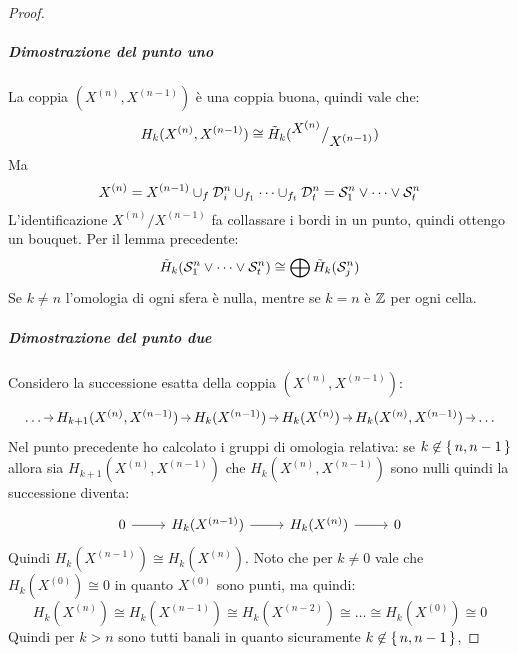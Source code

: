 \begin{proof}
  \subparagraph{Dimostrazione del punto uno}
    La coppia $ (X^{(n)}, X^{(n-1)}) $ è una coppia buona, quindi vale che:
    \[
      H_k(X^{(n)}, X^{(n-1)}) \cong \tilde{H}_k({^{\textstyle X^{(n)}}\big/_{\textstyle X^{(n-1)}}})
    \]
    Ma
    \[
      X^{(n)} = X^{(n-1)} \cup_f \mathcal{D}^{n}_{i} \cup_{f_1} \dots \cup_{f_t} \mathcal{D}^{n}_{t} = \mathcal{S}^{n}_{1} \vee \dots \vee \mathcal{S}^{n}_{t}
    \]
    L'identificazione $ {X^{(n)}} \slash {X^{(n-1)}} $ fa collassare i bordi in un punto, quindi ottengo
    un bouquet.
    Per il lemma precedente:
    \[
      \tilde{H}_k(\mathcal{S}^{n}_{1} \vee \dots \vee \mathcal{S}^{n}_{t}) \cong \bigoplus \tilde{H}_k(\mathcal{S}^{n}_{j})
    \]
    Se $ k \not = n $ l'omologia di ogni sfera è nulla, mentre se $ k = n $ è
    $ \mathbb{Z} $ per ogni cella.

    \subparagraph{Dimostrazione del punto due}
    Considero la successione esatta della coppia $ (X^{(n)}, X^{(n-1)}) $:
    \[
      \begin{tikzcd}[nodes={column sep=7pt, inner sep = 2 pt }]
        \dots \rar & H_{k+1}(X^{(n)}, X^{(n-1)}) \rar & H_k(X^{(n-1)}) \rar & H_k(X^{(n)}) \rar & H_{k}(X^{(n)}, X^{(n-1)}) \rar & \dots
      \end{tikzcd}
    \]
    Nel punto precedente ho calcolato i gruppi di omologia relativa:
    se $ k \not \in \set{n, n-1} $ allora sia
    $ H_{k+1}(X^{(n)}, X^{(n-1)}) $ che $ H_k(X^{(n)}, X^{(n-1)}) $ sono nulli
    quindi la successione diventa:
    \[
      \begin{tikzcd}
        0 \rar   & H_k(X^{(n-1)}) \rar  & H_k(X^{(n)}) \rar & 0
      \end{tikzcd}
    \]
    Quindi $ H_k(X^{(n-1)}) \cong H_k(X^{(n)}) $. Noto che per $ k \not = 0 $ vale che
    $ H_k(X^{(0)}) \cong 0 $ in quanto $ X^{(0)} $ sono punti,
    ma quindi:
    \[
      H_k(X^{(n)}) \cong  H_k(X^{(n-1)}) \cong H_k(X^{(n-2)}) \cong \dots \cong H_k(X^{(0)}) \cong 0
    \]
    Quindi per $ k > n $ sono tutti banali in quanto sicuramente $ k \not \in \set{n, n-1} $,


\end{proof}
